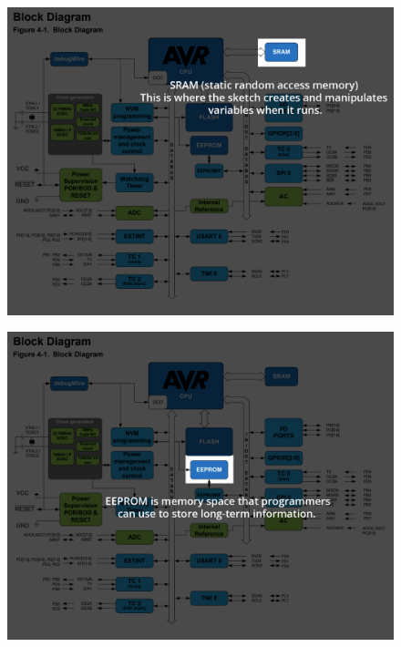 \begin{frame}
	\begin{figure}
		\includegraphics[scale=.2]{assets/sram}  
	\end{figure}
\end{frame}

\begin{frame}
	\begin{figure}
		\includegraphics[scale=.2]{assets/eeprom}  
	\end{figure}
\end{frame}

